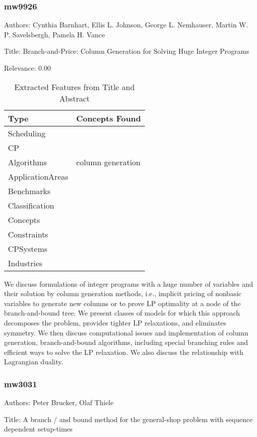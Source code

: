 \subsubsection{mw9926}
\label{mw:mw9926}

Authors: Cynthia Barnhart, Ellis L. Johnson, George L. Nemhauser, Martin W. P. Savelsbergh, Pamela H. Vance

Title: Branch-and-Price: Column Generation for Solving Huge Integer Programs

Relevance:  0.00

{\scriptsize
\begin{longtable}{p{2cm}p{20cm}}
\caption{Extracted Features from Title and Abstract}\\ \toprule
Type & Concepts Found\\ \midrule
\endhead
\bottomrule
\endfoot
Scheduling & \\ 
CP & \\ 
Algorithms & column generation\\ 
ApplicationAreas & \\ 
Benchmarks & \\ 
Classification & \\ 
Concepts & \\ 
Constraints & \\ 
CPSystems & \\ 
Industries & \\ 
\end{longtable}
}

  We discuss formulations of integer programs with a huge number of variables and their solution by column generation methods, i.e., implicit pricing of nonbasic variables to generate new columns or to prove LP optimality at a node of the branch-and-bound tree. We present classes of models for which this approach decomposes the problem, provides tighter LP relaxations, and eliminates symmetry. We then discuss computational issues and implementation of column generation, branch-and-bound algorithms, including special branching rules and efficient ways to solve the LP relaxation. We also discuss the relationship with Lagrangian duality.  

\subsubsection{mw3031}
\label{mw:mw3031}

Authors: Peter Brucker, Olaf Thiele

Title: A branch / and  bound method for the general-shop problem with sequence dependent setup-times


